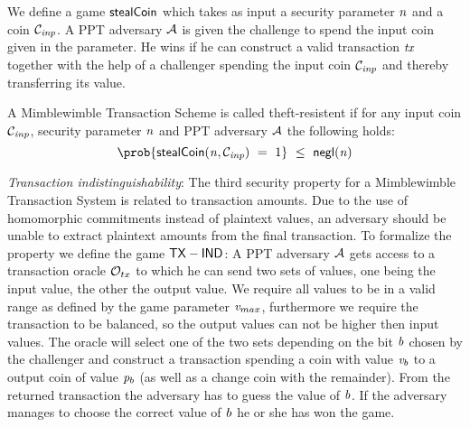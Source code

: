 We define a game $\mathsf{stealCoin}$ which takes as input a security parameter $\mathit{n}$ and a coin $\mathcal{C}_{\mathit{inp}}$. A PPT adversary $\mathcal{A}$ is given the challenge to spend the input coin given in the parameter.
He wins if he can construct a valid transaction $\mathit{tx}$ together with the help of a challenger spending the input coin $\mathcal{C}_{\mathit{inp}}$ and thereby transferring its value.

\begin{center}
\end{center}

\begin{definition} \label{def:atom:theft-resistence}
    A Mimblewimble Transaction Scheme is called theft-resistent if for any input coin $\mathcal{C}_{\mathit{inp}}$, security parameter $\mathit{n}$ and PPT adversary $\mathcal{A}$ the following holds:
    \[ \prob{\procStealCoin{\varN}{\varCoinInp} \opEqNoQ 1 } \opSmEq \funNegl{\varN} \]
\end{definition}

\emph{Transaction indistinguishability}: The third security property for a Mimblewimble Transaction System is related to transaction amounts. Due to the use of homomorphic commitments instead of plaintext values,
an adversary should be unable to extract plaintext amounts from the final transaction. To formalize the property we define the game $\mathsf{TX-IND}$:
A PPT adversary $\mathcal{A}$ gets access to a transaction oracle $\mathcal{O}_{tx}$ to which he can send two sets of values, one being the input value, the other the output value. We require all values to be in
a valid range as defined by the game parameter $\mathit{v}_{max}$, furthermore we require the transaction to be balanced, so the output values can not be higher then input values. The oracle will select one of the two
sets depending on the bit $\mathit{b}$ chosen by the challenger and construct a transaction spending a coin with value $\mathit{v}_b$ to a output coin of value $\mathit{p}_b$ (as well as a change coin with the remainder).
From the returned transaction the adversary has to guess the value of $\mathit{b}$.
If the adversary manages to choose the correct value of $\mathit{b}$ he or she has won the game.

